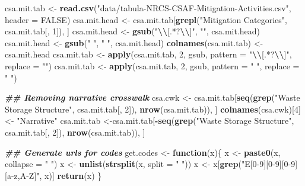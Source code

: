 \documentclass[
]{article}
\newenvironment{Shaded}{\begin{snugshade}}{\end{snugshade}}
\newcommand{\AttributeTok}[1]{\textcolor[rgb]{0.13,0.29,0.53}{#1}}
\newcommand{\ConstantTok}[1]{\textcolor[rgb]{0.56,0.35,0.01}{#1}}
\newcommand{\ControlFlowTok}[1]{\textcolor[rgb]{0.13,0.29,0.53}{\textbf{#1}}}
\newcommand{\DecValTok}[1]{\textcolor[rgb]{0.00,0.00,0.81}{#1}}
\newcommand{\DocumentationTok}[1]{\textcolor[rgb]{0.56,0.35,0.01}{\textbf{\textit{#1}}}}
\newcommand{\FunctionTok}[1]{\textcolor[rgb]{0.13,0.29,0.53}{\textbf{#1}}}
\newcommand{\NormalTok}[1]{#1}
\newcommand{\OtherTok}[1]{\textcolor[rgb]{0.56,0.35,0.01}{#1}}
\newcommand{\SpecialCharTok}[1]{\textcolor[rgb]{0.81,0.36,0.00}{\textbf{#1}}}
\newcommand{\StringTok}[1]{\textcolor[rgb]{0.31,0.60,0.02}{#1}}
\begin{document}
\begin{Shaded}
\begin{Highlighting}[]
\NormalTok{csa.mit.tab }\OtherTok{\textless{}{-}} \FunctionTok{read.csv}\NormalTok{(}\StringTok{"data/tabula{-}NRCS{-}CSAF{-}Mitigation{-}Activities.csv"}\NormalTok{, }\AttributeTok{header =} \ConstantTok{FALSE}\NormalTok{)}
\NormalTok{csa.mit.head }\OtherTok{\textless{}{-}}\NormalTok{ csa.mit.tab[}\FunctionTok{grepl}\NormalTok{(}\StringTok{"Mitigation Categories"}\NormalTok{, csa.mit.tab[, }\DecValTok{1}\NormalTok{]), ]}
\NormalTok{csa.mit.head }\OtherTok{\textless{}{-}} \FunctionTok{gsub}\NormalTok{(}\StringTok{"}\SpecialCharTok{\textbackslash{}\textbackslash{}}\StringTok{[.*?}\SpecialCharTok{\textbackslash{}\textbackslash{}}\StringTok{]"}\NormalTok{, }\StringTok{""}\NormalTok{, csa.mit.head)}
\NormalTok{csa.mit.head }\OtherTok{\textless{}{-}} \FunctionTok{gsub}\NormalTok{(}\StringTok{"  "}\NormalTok{, }\StringTok{" "}\NormalTok{, csa.mit.head)}
\FunctionTok{colnames}\NormalTok{(csa.mit.tab) }\OtherTok{\textless{}{-}}\NormalTok{ csa.mit.head}
\NormalTok{csa.mit.tab }\OtherTok{\textless{}{-}} \FunctionTok{apply}\NormalTok{(csa.mit.tab, }\DecValTok{2}\NormalTok{, gsub, }\AttributeTok{pattern =} \StringTok{"}\SpecialCharTok{\textbackslash{}\textbackslash{}}\StringTok{[.*?}\SpecialCharTok{\textbackslash{}\textbackslash{}}\StringTok{]"}\NormalTok{, }\AttributeTok{replace =} \StringTok{""}\NormalTok{)}
\NormalTok{csa.mit.tab }\OtherTok{\textless{}{-}} \FunctionTok{apply}\NormalTok{(csa.mit.tab, }\DecValTok{2}\NormalTok{, gsub, }\AttributeTok{pattern =} \StringTok{"  "}\NormalTok{, }\AttributeTok{replace =} \StringTok{" "}\NormalTok{)}

\DocumentationTok{\#\# Removing narrative crosswalk}
\NormalTok{csa.cwk }\OtherTok{\textless{}{-}}\NormalTok{ csa.mit.tab[}\FunctionTok{seq}\NormalTok{(}\FunctionTok{grep}\NormalTok{(}\StringTok{"Waste Storage Structure"}\NormalTok{, csa.mit.tab[, }\DecValTok{2}\NormalTok{]), }\FunctionTok{nrow}\NormalTok{(csa.mit.tab)), ]}
\FunctionTok{colnames}\NormalTok{(csa.cwk)[}\DecValTok{4}\NormalTok{] }\OtherTok{\textless{}{-}} \StringTok{"Narrative"}
\NormalTok{csa.mit.tab }\OtherTok{\textless{}{-}}\NormalTok{csa.mit.tab[}\SpecialCharTok{{-}}\FunctionTok{seq}\NormalTok{(}\FunctionTok{grep}\NormalTok{(}\StringTok{"Waste Storage Structure"}\NormalTok{, csa.mit.tab[, }\DecValTok{2}\NormalTok{]), }\FunctionTok{nrow}\NormalTok{(csa.mit.tab)), ]}

\DocumentationTok{\#\# Generate urls for codes}
\NormalTok{get.codes }\OtherTok{\textless{}{-}} \ControlFlowTok{function}\NormalTok{(x)\{}
\NormalTok{    x }\OtherTok{\textless{}{-}} \FunctionTok{paste0}\NormalTok{(x, }\AttributeTok{collapse =} \StringTok{" "}\NormalTok{)}
\NormalTok{    x }\OtherTok{\textless{}{-}} \FunctionTok{unlist}\NormalTok{(}\FunctionTok{strsplit}\NormalTok{(x, }\AttributeTok{split =} \StringTok{" "}\NormalTok{))}
\NormalTok{    x }\OtherTok{\textless{}{-}}\NormalTok{ x[}\FunctionTok{grep}\NormalTok{(}\StringTok{"E[0{-}9][0{-}9][0{-}9][a{-}z,A{-}Z]"}\NormalTok{, x)]}
    \FunctionTok{return}\NormalTok{(x)}
\NormalTok{\}}


\end{Highlighting}
\end{Shaded}
\end{document}
